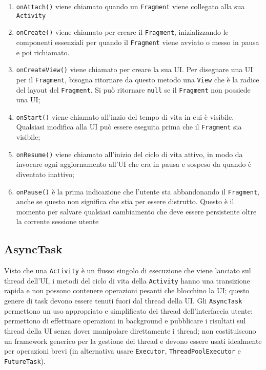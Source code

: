 \begin{enumerate}
\item \texttt{onAttach()} viene chiamato quando un \texttt{Fragment} viene
collegato alla sua \texttt{Activity}
\item \texttt{onCreate()} viene chiamato per creare il \texttt{Fragment},
inizializzando le componenti essenziali per quando il \texttt{Fragment} viene
avviato o messo in pausa e poi richiamato.
\item \texttt{onCreateView()} viene chiamato per creare la sua UI. Per disegnare
una UI per il \texttt{Fragment}, bisogna ritornare da questo metodo una
\texttt{View} che è la radice del layout del \texttt{Fragment}. Si può ritornare
\texttt{null} se il \texttt{Fragment} non possiede una UI;
\item \texttt{onStart()} viene chiamato all'inzio del tempo di vita in cui è
visibile. Qualsiasi modifica alla UI può essere eseguita prima che il
\texttt{Fragment} sia visibile;
\item \texttt{onResume()} viene chiamato all'inizio del ciclo di vita attivo, in
modo da invocare ogni aggiornamento all'UI che era in pausa e sospeso da quando
è diventato inattivo;
\item \texttt{onPause()} è la prima indicazione che l'utente sta abbandonando il
\texttt{Fragment}, anche se questo non significa che stia per essere distrutto.
Questo è il momento per salvare qualsiasi cambiamento che deve essere
persistente oltre la corrente sessione utente
\end{enumerate}


\subsection{AsyncTask}

Visto che una \texttt{Activity} è un flusso singolo di esecuzione che viene
lanciato sul thread dell'UI, i metodi del ciclo di vita della \texttt{Activity}
hanno una transizione rapida e non possono contenere operazioni pesanti che
blocchino la UI; questo genere di task devono essere tenuti fuori dal thread
della UI.
Gli \texttt{AsyncTask} permettono un uso appropriato e simplificato dei thread
dell'interfaccia utente: permettono di effettuare operazioni in background e
pubblicare i risultati sul thread della UI senza dover manipolare direttamente i
thread; non costituiscono un framework generico per la gestione dei thread e
devono essere usati idealmente per operazioni brevi (in alternativa usare
\texttt{Executor}, \texttt{ThreadPoolExecutor} e \texttt{FutureTask}).

